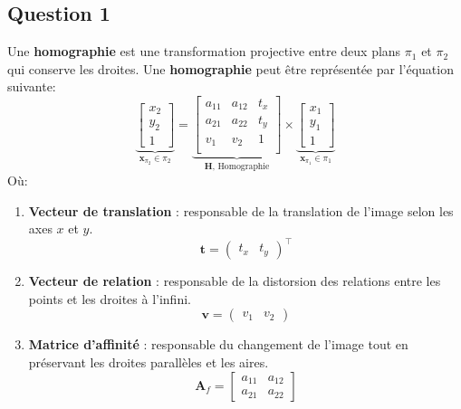 \documentclass[../CSC_5RO17_TA_TP1.tex]{subfiles}
\begin{document}
\subsection{Question 1}
\noindent Une \textbf{homographie} est une transformation projective entre deux plans $\pi_1$ et $\pi_2$ qui conserve les droites. Une \textbf{homographie} peut être représentée par l'équation suivante:
\begin{equation}
    \boxed{
        \underbrace{
            \begin{bmatrix}
            x_2\\ y_2\\ 1
            \end{bmatrix}
        }_{\mathbf{x}_{\pi_{2}}\in\pi_2}
        =
        \underbrace{
            \begin{bmatrix}
                a_{11} & a_{12} & t_x\\
                a_{21} & a_{22} & t_y\\
                v_1    & v_2    & 1\\
            \end{bmatrix}
        }_{\mathbf{H}\text{, Homographie}}
        \times
        \underbrace{
            \begin{bmatrix}
                x_1\\ y_1\\ 1
            \end{bmatrix}
        }_{\mathbf{x}_{\pi_{1}}\in\pi_1}
    }
\end{equation}
Où:
\begin{enumerate}[noitemsep, rightmargin=\leftmargin]
    \item \textbf{Vecteur de translation} : responsable de la translation de l'image selon les axes $x$ et $y$.
    \begin{equation}
        \mathbf{t} = \begin{pmatrix}t_x & t_y\end{pmatrix}^\intercal
    \end{equation}
    \item \textbf{Vecteur de relation} : responsable de la distorsion des relations entre les points et les droites à l'infini.
    \begin{equation}
        \mathbf{v} = \begin{pmatrix}v_1 & v_2\end{pmatrix}
    \end{equation}
    \item \textbf{Matrice d'affinité} : responsable du changement de l'image tout en préservant les droites parallèles et les aires.
    \begin{equation}
        \mathbf{A}_f = \begin{bmatrix} a_{11} & a_{12}\\ a_{21} & a_{22}\end{bmatrix}
    \end{equation}
\end{enumerate}
\end{document}
